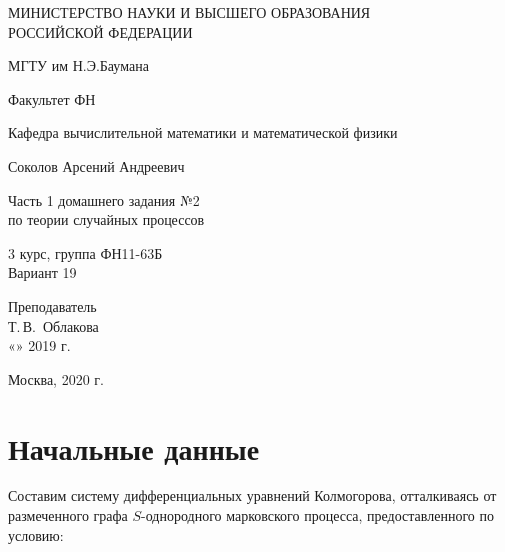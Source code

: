 \documentclass[14pt,a4paper]{scrartcl}
\begin{document}
	\begin{titlepage}
	\begin{center}
		\large
		МИНИСТЕРСТВО НАУКИ И ВЫСШЕГО ОБРАЗОВАНИЯ\\ РОССИЙСКОЙ ФЕДЕРАЦИИ
		
		\vspace{0.5cm}
		
		МГТУ им Н.Э.Баумана
		\vspace{0.25cm}
		
		Факультет ФН
		
		Кафедра вычислительной математики и математической физики
		\vfill
		
		
		Соколов Арсений Андреевич\\
		\vfill
		
		
		{\LARGE Часть 1 домашнего задания №2 \\ по теории случайных процессов\\[2mm]
		}
		\bigskip
		
		3 курс, группа ФН11-63Б\\
		Вариант 19
	\end{center}
	\vfill
	
	\newlength{\ML}
	\hfill\begin{minipage}{0.4\textwidth}
		Преподаватель\\
		\underline{\hspace{3cm}} Т.\,В.~Облакова\\
		«\underline{\hspace{0.7cm}}» \underline{\hspace{1.71cm}} 2019 г.
	\end{minipage}%
	\bigskip
	
	
	\vfill
	
	\begin{center}
		Москва, 2020 г.
	\end{center}
\end{titlepage}

\section*{Начальные данные}

Составим систему дифференциальных уравнений Колмогорова, отталкиваясь от размеченного графа $S$-однородного марковского процесса, предоставленного по условию:
\end{document}
